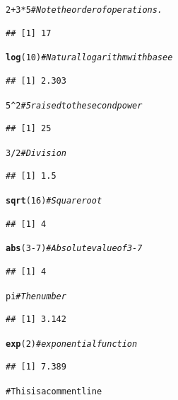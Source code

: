 \documentclass[english,nohyper]{tufte-book}\usepackage[]{graphicx}\usepackage[]{color}
\makeatletter
\newcommand{\hlnum}[1]{\textcolor[rgb]{0.686,0.059,0.569}{#1}}%
\newcommand{\hlcom}[1]{\textcolor[rgb]{0.678,0.584,0.686}{\textit{#1}}}%
\newcommand{\hlopt}[1]{\textcolor[rgb]{0,0,0}{#1}}%
\newcommand{\hlstd}[1]{\textcolor[rgb]{0.345,0.345,0.345}{#1}}%
\newcommand{\hlkwd}[1]{\textcolor[rgb]{0.737,0.353,0.396}{\textbf{#1}}}%
\newenvironment{kframe}{%
 \def\at@end@of@kframe{}%
 \ifinner\ifhmode%
  \def\at@end@of@kframe{\end{minipage}}%
  \begin{minipage}{\columnwidth}%
 \fi\fi%
 \def\FrameCommand##1{\hskip\@totalleftmargin \hskip-\fboxsep
 \colorbox{shadecolor}{##1}\hskip-\fboxsep
     \hskip-\linewidth \hskip-\@totalleftmargin \hskip\columnwidth}%
 \MakeFramed {\advance\hsize-\width
   \@totalleftmargin\z@ \linewidth\hsize
   \@setminipage}}%
 {\par\unskip\endMakeFramed%
 \at@end@of@kframe}
\newenvironment{knitrout}{}{} %
\makeatother
\begin{document}
\begin{knitrout}
\color{fgcolor}\begin{kframe}
\begin{alltt}
\hlnum{2} \hlopt{+} \hlnum{3} \hlopt{*} \hlnum{5}  \hlcom{# Note the order of operations. }
\end{alltt}
\begin{verbatim}
## [1] 17
\end{verbatim}
\begin{alltt}
\hlkwd{log}\hlstd{(}\hlnum{10}\hlstd{)}  \hlcom{# Natural logarithm with base e}
\end{alltt}
\begin{verbatim}
## [1] 2.303
\end{verbatim}
\begin{alltt}
\hlnum{5}\hlopt{^}\hlnum{2}  \hlcom{# 5 raised to the second power }
\end{alltt}
\begin{verbatim}
## [1] 25
\end{verbatim}
\begin{alltt}
\hlnum{3}\hlopt{/}\hlnum{2}  \hlcom{# Division }
\end{alltt}
\begin{verbatim}
## [1] 1.5
\end{verbatim}
\begin{alltt}
\hlkwd{sqrt}\hlstd{(}\hlnum{16}\hlstd{)}  \hlcom{# Square root }
\end{alltt}
\begin{verbatim}
## [1] 4
\end{verbatim}
\begin{alltt}
\hlkwd{abs}\hlstd{(}\hlnum{3} \hlopt{-} \hlnum{7}\hlstd{)}  \hlcom{# Absolute value of 3-7 }
\end{alltt}
\begin{verbatim}
## [1] 4
\end{verbatim}
\begin{alltt}
\hlstd{pi}  \hlcom{# The number }
\end{alltt}
\begin{verbatim}
## [1] 3.142
\end{verbatim}
\begin{alltt}
\hlkwd{exp}\hlstd{(}\hlnum{2}\hlstd{)}  \hlcom{# exponential function }
\end{alltt}
\begin{verbatim}
## [1] 7.389
\end{verbatim}
\begin{alltt}
# This is a comment line
\end{alltt}
\end{kframe}
\end{knitrout}
\end{document}
